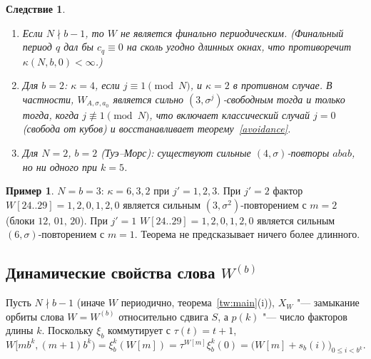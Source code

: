 \documentclass[a4paper,14pt]{extreport}
\theoremstyle{plain}
\newtheorem{corollary}[theorem]{Следствие}
\theoremstyle{definition}
\newtheorem{example}{Пример}
\theoremstyle{remark}
\begin{document}
\begin{corollary}\label{tw:cor}
	\begin{enumerate}
		\item Если $N\nmid b-1$, то $W$ не является финально периодическим.
		(Финальный период $q$ дал бы $c_q\equiv0$ на сколь угодно длинных окнах, что противоречит $\kappa(N,b,0)<\infty$.)
		\item Для $b=2$: $\kappa=4$, если $j\equiv1\pmod N$, и $\kappa=2$ в противном случае. В частности, $W_{A,\sigma,a_0}$ является
		сильно $(3,\sigma^j)$-свободным тогда и только тогда, когда $j\not\equiv1\pmod N$, что включает классический случай $j=0$ (свобода от кубов)
		и восстанавливает теорему~\ref{avoidance}.
		\item Для $N=2$, $b=2$ (Туэ--Морс): существуют сильные $(4,\sigma)$-повторы $abab$, но ни одного при $k=5$.
	\end{enumerate}
\end{corollary}

\begin{example}
	$N=b=3$: $\kappa=6,3,2$ при $j'=1,2,3$. При $j'=2$ фактор $W[24..29]=1,2,0,1,2,0$ является сильным $(3,\sigma^2)$-повторением с $m=2$
	(блоки $12,\,01,\,20$). При $j'=1$ $W[24..29]=1,2,0,1,2,0$ является сильным $(6,\sigma)$-повторением с $m=1$. Теорема не предсказывает ничего более длинного.
\end{example}
\subsection{Динамические свойства слова $W^{(b)}$}\label{sec:dynWb}

Пусть $N\nmid b-1$ (иначе $W$ периодично, теорема~\ref{tw:main}(i)), $X_W$ "--- замыкание орбиты слова $W=W^{(b)}$
относительно сдвига $S$, а $p(k)$ "--- число факторов длины $k$. Поскольку $\xi_b$ коммутирует с $\tau(t)=t+1$,
\begin{equation}\label{eq:blocks}
	W[mb^k,(m+1)b^k)=\xi_b^k(W[m])=\tau^{W[m]}\xi_b^k(0)=\bigl(W[m]+s_b(i)\bigr)_{0\le i<b^k}.
\end{equation}
\end{document}
